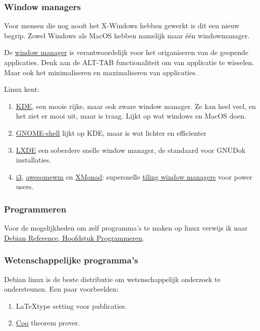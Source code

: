 \subsubsection{Window managers}
Voor mensen die nog nooit het X-Windows hebben gewerkt is dit een nieuw begrip. Zowel Windows als MacOS hebben namelijk maar \'{e}\'{e}n windowmanager. 

De \href{https://en.wikipedia.org/wiki/Window_manager}{window manager} is verantwoordelijk voor het origaniseren van de geopende applicaties. Denk aan de \textsc{ALT-TAB} functionaliteit om van applicatie te wisselen. Maar ook het minimaliseren en maximaliseren van applicaties.

Linux kent:

\begin{enumerate}
	\item \href{https://www.kde.org/}{KDE}, een mooie rijke, maar ook zware window manager. Ze kan heel veel, en het ziet er mooi uit, maar is traag. Lijkt op wat windows en MacOS doen.
	\item \href{http://www.gnome.org/}{GNOME-shell} lijkt op KDE, maar is wat lichter en effic\"{i}enter
	\item \href{http://lxde.org/}{LXDE} een soberdere snelle window manager, de standaard voor GNUDok installaties.
	\item \href{http://i3wm.org/}{i3}, \href{http://awesome.naquadah.org/}{awesomewm} en \href{http://xmonad.org/}{XMonad}: supersnelle \href{https://en.wikipedia.org/wiki/Tiling_window_manager}{tiling window managers} voor power users.
\end{enumerate}

\subsubsection{Programmeren}
Voor de mogelijkheden om zelf programma's te maken op linux verwijs ik naar \href{https://www.debian.org/doc/manuals/debian-reference/ch12.en.html}{Debian Reference, Hoofdstuk Programmeren}.

\subsubsection{Wetenschappelijke programma's}
Debian linux is de beste distributie om wetenschappelijk onderzoek te ondersteunen. Een paar voorbeelden:

\begin{enumerate}
	\item \LaTeX type setting voor publicaties.
	\item \href{https://coq.inria.fr/}{Coq} theorem prover.
\end{enumerate}

